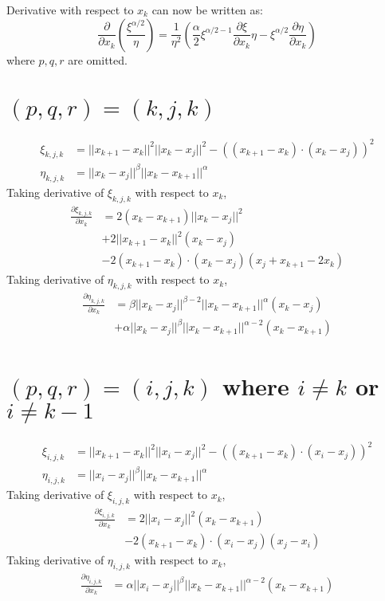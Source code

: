 \documentclass[a4paper]{article}
\newcommand{\norm}[1]{||#1||}
\begin{document}
Derivative with respect to $x_k$ can now be written as:
\begin{equation}
    \frac{\partial}{\partial x_k} \left( \frac{\xi^{\alpha/2}}{\eta} \right) = \frac{1}{\eta^2} \left( \frac{\alpha}{2} \xi^{\alpha/2 - 1} \frac{\partial \xi}{\partial x_k} \eta - \xi^{\alpha/2} \frac{\partial \eta}{\partial x_k} \right)
\end{equation}
where $p,q,r$ are omitted.

\section{$(p,q,r) = (k, j, k)$}
\begin{align}
    \xi_{k,j,k} &= \norm{x_{k+1} - x_k}^2 \norm{x_k - x_j}^2- \left( \left( x_{k+1} - x_{k} \right) \cdot \left( x_{k} - x_{j} \right) \right)^2 \\
    \eta_{k,j,k} &= \norm{x_k - x_j}^{\beta} \norm{x_k - x_{k+1}}^{\alpha}
\end{align}
Taking derivative of $\xi_{k,j,k}$ with respect to $x_k$,
\begin{align}
    \frac{\partial \xi_{k,j,k}}{\partial x_k} &= 2\left( x_k - x_{k+1} \right) \norm{x_k - x_j}^2 \\
    &+ 2 \norm{x_{k+1} - x_k}^2 \left( x_k - x_j \right) \\
    &- 2 \left( x_{k+1} - x_k \right) \cdot \left( x_k - x_j \right) \left( x_j + x_{k+1} - 2 x_k \right)
\end{align}
Taking derivative of $\eta_{k,j,k}$ with respect to $x_k$,
\begin{align}
    \frac{\partial \eta_{k,j,k}}{\partial x_k} &= \beta \norm{x_k - x_j}^{\beta - 2} \norm{x_k - x_{k+1}}^{\alpha} \left( x_k - x_j \right)\\
    &+ \alpha \norm{x_k - x_j}^{\beta} \norm{x_k - x_{k+1}}^{\alpha - 2} \left( x_k - x_{k+1} \right)
\end{align}

\section{$(p,q,r) = (i, j, k)$ where $i \neq k$ or $i \neq k-1$}
\begin{align}
    \xi_{i,j,k} &= \norm{x_{k+1} - x_k}^2 \norm{x_i - x_j}^2- \left( \left( x_{k+1} - x_{k} \right) \cdot \left( x_{i} - x_{j} \right) \right)^2 \\
    \eta_{i,j,k} &= \norm{x_i - x_j}^{\beta} \norm{x_k - x_{k+1}}^{\alpha}
\end{align}
Taking derivative of $\xi_{i,j,k}$ with respect to $x_k$,
\begin{align}
    \frac{\partial \xi_{i,j,k}}{\partial x_k} &= 2 \norm{x_i - x_j}^2 \left( x_k - x_{k+1} \right) \\
    &- 2 \left( x_{k+1} - x_k \right) \cdot \left( x_i - x_j \right) \left( x_j - x_i \right)
\end{align}
Taking derivative of $\eta_{i,j,k}$ with respect to $x_k$,
\begin{align}
    \frac{\partial \eta_{i,j,k}}{\partial x_k} &= \alpha \norm{x_i - x_j}^{\beta} \norm{x_k - x_{k+1}}^{\alpha - 2} \left( x_k - x_{k+1} \right)
\end{align}
\end{document}
